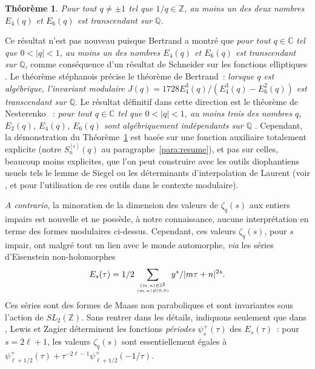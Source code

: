 \documentclass[12pt]{amsart}
\newcommand{\ep}{\epsilon}
\newtheorem{theo}{Th{\'e}or{\`e}me}
\theoremstyle{remark}
\numberwithin{equation}{section}
\begin{document}
\begin{theo}
\label{theo:modu}
Pour tout $q\not =\pm1$ tel que $1/q\in\mathbb{Z}$, au moins un 
des deux nombres 
$E_4(q)$ et $E_6(q)$ est transcendant sur $\mathbb{Q}$.
\end{theo}

Ce r{\'e}sultat n'est pas nouveau puisque Bertrand \cite{ber} a montr{\'e}  
que {\it {\og pour tout $q\in\mathbb{C}$ tel que 
$0<\vert q\vert <1$,  au moins un des nombres $E_4(q)$ et $E_6(q)$ est 
transcendant sur $\mathbb{Q}$\fg}}, comme 
cons{\'e}quence  
d'un r{\'e}sultat de Schneider sur les fonctions elliptiques 
\cite[Th{\'e}or{\`e}me~18, p.~64]{sch}. 
Le th{\'e}or{\`e}me st{\'e}phanois \cite{bdgp} pr{\'e}cise le
th{\'e}or{\`e}me de Bertrand~: {\it {\og lorsque $q$ est alg{\'e}brique, 
l'invariant modulaire $J(q)=1728 E_4^3(q)/(E_4^3(q)-E_6^2(q))$ est
transcendant sur $\mathbb Q$\fg}}.
Le r{\'e}sultat d{\'e}finitif dans cette direction 
est le th{\'e}or{\`e}me de Nes\-te\-ren\-ko \cite{ne3}~: 
{\it\og 
pour tout $q\in\mathbb{C}$ tel que 
$0<\vert q\vert <1$, au moins trois des nombres $q$, $E_{2}(q)$, 
$E_4(q)$, $E_6(q)$ sont  alg{\'e}briquement 
ind{\'e}pendants sur $\mathbb{Q}$ \fg}. 
Cependant, la d{\'e}monstration du Th{\'e}or{\`e}me~\ref{theo:modu} est
bas{\'e}e sur une fonction auxiliaire totalement explicite 
(notre $S_n^{[\ep]}(q)$ au paragraphe~\ref{para:resume}), et pas sur
celles, beaucoup 
moins explicites, que l'on peut construire 
avec les outils diophantiens usuels tels le lemme de Siegel ou les
d{\'e}terminants d'interpolation de Laurent 
(voir \cite{bdgp}, \cite{ne3} et \cite{pph} 
pour l'utilisation de ces outils dans le contexte modulaire). 

{\it A contrario}, la minoration de la dimension des valeurs de $\zeta_q(s)$ 
aux entiers impairs est nouvelle 
et ne poss{\`e}de, {\`a} notre connaissance, 
aucune interpr{\'e}tation en terme des formes
modulaires ci-dessus. Cependant, ces valeurs $\zeta_q(s)$, pour $s$ impair, 
ont malgr{\'e} tout un lien avec le monde automorphe, {\it via} les 
s{\'e}ries d'Eisenstein non-holomorphes  
$$
E_s(\tau)=\frac{1}{2}
\sum_{{(m,n)\in\mathbb{Z}^2\atop (m,n)\neq(0,0)}}\frac{y^s}{\vert m\tau+n\vert^{2s}}.
$$ 
Ces s{\'e}ries sont des formes de Maass non paraboliques et 
sont invariantes sous l'action de 
$SL_2(\mathbb{Z})$. Sans rentrer dans les d{\'e}tails, indiquons 
seulement que dans \cite[p. 243]{lewzag}, Lewis et Zagier d{\'e}terminent   
les fonctions 
{\it p{\'e}riodes} $\psi_s^{+}(\tau)$ des $E_s(\tau)$~: pour $s=2\ell+1$, les valeurs $\zeta_q(s)$ sont 
essentiellement {\'e}gales {\`a} $\psi_{\ell+1/2}^{+}(\tau)+\tau^{-2\ell-1}\psi_{\ell+1/2}^{+}(-1/\tau)$. 
\end{document}
